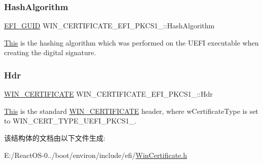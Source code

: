 \subsubsection{\texorpdfstring{Hash\+Algorithm}{HashAlgorithm}}
{\footnotesize\ttfamily \hyperlink{_uefi_base_type_8h_ad87614428813f71edb2c2d802e9ce2af}{E\+F\+I\+\_\+\+G\+U\+ID} W\+I\+N\+\_\+\+C\+E\+R\+T\+I\+F\+I\+C\+A\+T\+E\+\_\+\+E\+F\+I\+\_\+\+P\+K\+C\+S1\+\_\+::\+Hash\+Algorithm}

\hyperlink{namespace_this}{This} is the hashing algorithm which was performed on the U\+E\+FI executable when creating the digital signature. \mbox{\label{struct_w_i_n___c_e_r_t_i_f_i_c_a_t_e___e_f_i___p_k_c_s1__15_a42352d4c15c40f7a17027f46f83e332e}} 
\subsubsection{\texorpdfstring{Hdr}{Hdr}}
{\footnotesize\ttfamily \hyperlink{struct_w_i_n___c_e_r_t_i_f_i_c_a_t_e}{W\+I\+N\+\_\+\+C\+E\+R\+T\+I\+F\+I\+C\+A\+TE} W\+I\+N\+\_\+\+C\+E\+R\+T\+I\+F\+I\+C\+A\+T\+E\+\_\+\+E\+F\+I\+\_\+\+P\+K\+C\+S1\+\_\+::\+Hdr}

\hyperlink{namespace_this}{This} is the standard \hyperlink{struct_w_i_n___c_e_r_t_i_f_i_c_a_t_e}{W\+I\+N\+\_\+\+C\+E\+R\+T\+I\+F\+I\+C\+A\+TE} header, where w\+Certificate\+Type is set to W\+I\+N\+\_\+\+C\+E\+R\+T\+\_\+\+T\+Y\+P\+E\+\_\+\+U\+E\+F\+I\+\_\+\+P\+K\+C\+S1\+\_. 

该结构体的文档由以下文件生成\+:\begin{DoxyCompactItemize}
\item 
E\+:/\+React\+O\+S-\/0../boot/environ/include/efi/\hyperlink{_win_certificate_8h}{Win\+Certificate.\+h}\end{DoxyCompactItemize}
